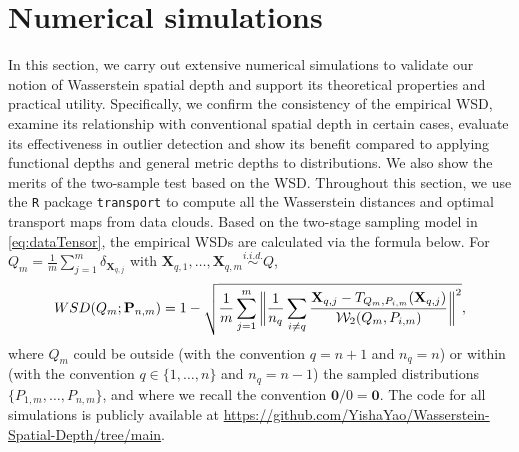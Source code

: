 \documentclass{imsart}
\numberwithin{equation}{section}
\def\X{\mathbf{X}}
\begin{document}






\section{Numerical simulations}\label{section:simulation}
In this section, we carry out extensive numerical simulations to validate our notion of Wasserstein spatial depth and support its theoretical properties and practical utility. Specifically, we confirm the consistency of the empirical WSD, examine its relationship with conventional spatial depth in certain cases, evaluate its effectiveness in outlier detection and show its benefit compared to applying functional depths 
and general metric depths
to distributions. 
We also show the merits of the two-sample test based on the WSD. 
Throughout this section, we use the \texttt{R} package \texttt{transport} to compute all the Wasserstein distances and optimal transport maps from data clouds. Based on the two-stage sampling model in \eqref{eq:dataTensor}, the empirical WSDs are calculated via the formula below. For $Q_m = \frac{1}{m}\sum_{j=1}^m \delta_{\X_{q,j}}$ with $\X_{q,1} , \ldots , \X_{q,m} \stackrel{\textit{i.i.d.
}}{\sim} Q$,
\begin{equation}\label{empirical_WSD_1}
	{\rm WSD}(Q_m; {\bf P}_{n,m}) = 1- \sqrt{ \frac{1}{m} \sum_{j=1}^m  \bigg\| \frac{1}{n_q}\sum_{i\neq q} \frac{\X_{q,j}-T_{Q_m, P_{i,m}}(\X_{q,j})}{\mathcal{W}_2(Q_m, P_{i,m})} \bigg\|^2 },
\end{equation}
where $Q_m$ could be outside (with the convention $q = n+1$ and $n_q=n$) or within (with the convention $q \in \{1,\ldots,n\}$ and $n_q= n-1$) the sampled distributions $\{ P_{1,m}, \ldots, P_{n,m} \}$, and where we recall the convention $\mathbf{0}/0 = \mathbf{0}$. 
The code for all simulations is publicly available at \url{https://github.com/YishaYao/Wasserstein-Spatial-Depth/tree/main}. 
\end{document}

